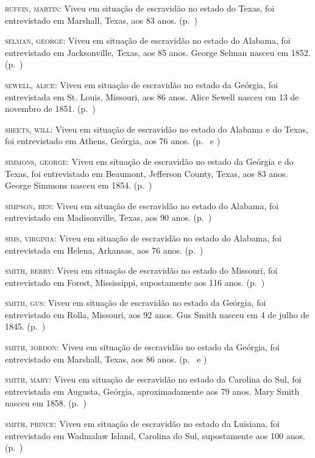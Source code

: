 \begin{Parskip}
\textsc{ruffin, martin:} Viveu em situação de escravidão no estado do Texas, foi entrevistado em
Marshall, Texas, aos 83 anos. (p.~\pageref{ref234})

\textsc{selman, george:} Viveu em situação de escravidão no estado do Alabama, foi entrevistado
em Jacksonville, Texas, aos 85 anos. George Selman nasceu em 1852. (p.~\pageref{ref235})

\textsc{sewell, alice:} Viveu em situação de escravidão no estado da Geórgia, foi entrevistada
em St. Louis, Missouri, aos 86 anos. Alice Sewell nasceu em 13 de
novembro de 1851. (p.~\pageref{ref236})

\textsc{sheets, will:} Viveu em situação de escravidão no estado do Alabama e do Texas, foi
entrevistado em Athens, Geórgia, aos 76 anos. (p.~\pageref{ref237} e \pageref{ref238})

\textsc{simmons, george:} Viveu em situação de escravidão no estado da Geórgia e do Texas, foi
entrevistado em Beaumont, Jefferson County, Texas, aos 83 anos. George
Simmons nasceu em 1854. (p.~\pageref{ref239})

\textsc{simpson, ben:} Viveu em situação de escravidão no estado do Alabama, foi entrevistado em
Madisonville, Texas, aos 90 anos. (p.~\pageref{ref240})

\textsc{sims, virginia:} Viveu em situação de escravidão no estado do Alabama, foi entrevistada
em Helena, Arkansas, aos 76 anos. (p.~\pageref{ref241})

\textsc{smith, berry:} Viveu em situação de escravidão no estado do Missouri, foi entrevistado
em Forest, Mississippi, supostamente aos 116 anos. (p.~\pageref{ref242})

\textsc{smith, gus:} Viveu em situação de escravidão no estado da Geórgia, foi entrevistado em
Rolla, Missouri, aos 92 anos. Gus Smith nasceu em 4 de julho de 1845. (p.~\pageref{ref243})

\textsc{smith, jordon:} Viveu em situação de escravidão no estado da Geórgia, foi entrevistado
em Marshall, Texas, aos 86 anos. (p.~\pageref{ref244} e \pageref{ref245})

\textsc{smith, mary:} Viveu em situação de escravidão no estado da Carolina do Sul, foi
entrevistada em Augusta, Geórgia, aproximadamente aos 79 anos. Mary
Smith nasceu em 1858. (p.~\pageref{ref246})

\textsc{smith, prince:} Viveu em situação de escravidão no estado da Luisiana, foi entrevistado
em Wadmalaw Island, Carolina do Sul, supostamente aos 100 anos. (p.~\pageref{ref247})


\end{Parskip}
